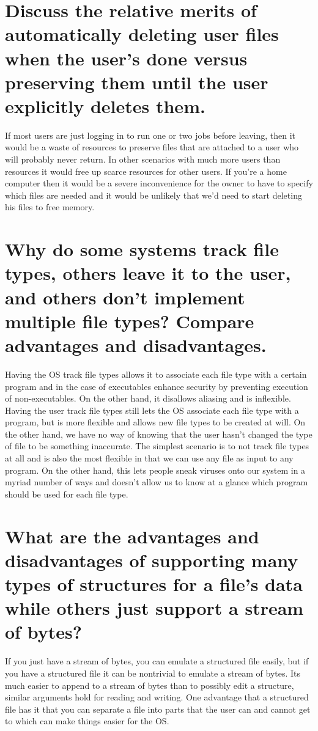 \documentclass{book}%
\begin{document}
\section{Discuss the relative merits of automatically deleting user files when
the user's done versus preserving them until the user explicitly deletes them.}
If most users are just logging in to run one or two jobs before leaving, then it
would be a waste of resources to preserve files that are attached to a user who
will probably never return. In other scenarios with much more users than
resources it would free up scarce resources for other users. If you're a home
computer then it would be a severe inconvenience for the owner to have to
specify which files are needed and it would be unlikely that we'd need to start
deleting his files to free memory.
\section{Why do some systems track file types, others leave it to the user, and
others don't implement multiple file types? Compare advantages and
disadvantages.}
Having the OS track file types allows it to associate each file type with a
certain program and in the case of executables enhance security by preventing
execution of non-executables. On the other hand, it disallows aliasing and is
inflexible. Having the user track file types still lets the OS associate each
file type with a program, but is more flexible and allows new file types to be
created at will. On the other hand, we have no way of knowing that the user
hasn't changed the type of file to be something inaccurate. The simplest
scenario is to not track file types at all and is also the most flexible in
that we can use any file as input to any program. On the other hand, this lets
people sneak viruses onto our system in a myriad number of ways and doesn't
allow us to know at a glance which program should be used for each file type.
\section{What are the advantages and disadvantages of supporting many types of
structures for a file's data while others just support a stream of bytes? }
If you just have a stream of bytes, you can emulate a structured file easily,
but if you have a structured file it can be nontrivial to emulate a stream of
bytes. Its much easier to append to a stream of bytes than to possibly edit a
structure, similar arguments hold for reading and writing. One advantage that a
structured file has it that you can separate a file into parts that the user can
and cannot get to which can make things easier for the OS.
\end{document}
